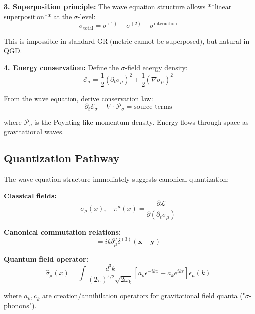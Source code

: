 \documentclass[11pt,a4paper]{article}
\theoremstyle{definition}
\theoremstyle{remark}
\begin{document}
		\textbf{3. Superposition principle:}
		The wave equation structure allows **linear superposition** at the $\sigma$-level:
		\begin{equation}
			\sigma_{\text{total}} = \sigma^{(1)} + \sigma^{(2)} + \sigma^{\text{interaction}}
		\end{equation}
		
		This is impossible in standard GR (metric cannot be superposed), but natural in QGD.
		
		\textbf{4. Energy conservation:}
		Define the $\sigma$-field energy density:
		\begin{equation}
			\mathcal{E}_\sigma = \frac{1}{2}(\partial_t\sigma_\mu)^2 + \frac{1}{2}(\nabla\sigma_\mu)^2
		\end{equation}
		
		From the wave equation, derive conservation law:
		\begin{equation}
			\partial_t\mathcal{E}_\sigma + \nabla \cdot \mathcal{P}_\sigma = \text{source terms}
		\end{equation}
		
		where $\mathcal{P}_\sigma$ is the Poynting-like momentum density. Energy flows through space as gravitational waves.
		
		\subsection{Quantization Pathway}
		
		The wave equation structure immediately suggests canonical quantization:
		
		\textbf{Classical fields:}
		\begin{equation}
			\sigma_\mu(x), \quad \pi^\mu(x) = \frac{\partial \mathcal{L}}{\partial(\partial_t\sigma_\mu)}
		\end{equation}
		
		\textbf{Canonical commutation relations:}
		\begin{equation}
			[\hat{\sigma}_\mu(x), \hat{\pi}^\nu(y)] = i\hbar\delta^\nu_\mu\delta^{(3)}(\mathbf{x} - \mathbf{y})
		\end{equation}
		
		\textbf{Quantum field operator:}
		\begin{equation}
			\hat{\sigma}_\mu(x) = \int \frac{d^3k}{(2\pi)^{3/2}\sqrt{2\omega_k}}\left[a_k e^{-ikx} + a_k^\dagger e^{ikx}\right]\epsilon_\mu(k)
		\end{equation}
		
		where $a_k, a_k^\dagger$ are creation/annihilation operators for gravitational field quanta ("$\sigma$-phonons").
		
\end{document}
